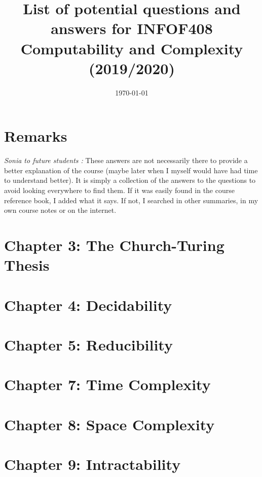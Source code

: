 \documentclass[a4paper]{scrartcl}
\title{List of potential questions and answers for INFOF408 Computability and Complexity (2019/2020)}
\date{\today}
\author{}
\begin{document}
\maketitle
\tableofcontents
\clearpage

\section*{Remarks}
\textit{Sonia to future students : } These answers are not necessarily there to provide a better explanation of the course (maybe later when I myself would have had time to understand better).  It is simply a collection of the answers to the questions to avoid looking everywhere to find them. If it was easily found in the course reference book, I added what it says. If not, I searched in other summaries, in my own course notes or on the internet. 
\newpage
\section{Chapter 3: The Church-Turing Thesis}

\clearpage
\section{Chapter 4: Decidability}

\clearpage
\section{Chapter 5: Reducibility}

\clearpage
\section{Chapter 7: Time Complexity}

\clearpage
\section{Chapter 8: Space Complexity}

\clearpage
\section{Chapter 9: Intractability}


\nocite{*}
\printbibliography
\end{document}
